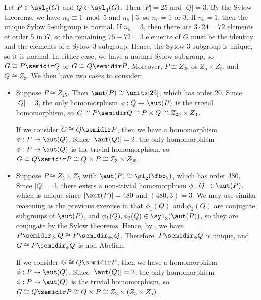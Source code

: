 \begin{sol}
    Let $P \in \syl_5(G)$ and $Q \in \syl_3(G)$.
	Then $|P| = 25$ and $|Q| = 3$.
	By the Sylow theorems, we have $n_5 \equiv 1 \bmod 5$ and $n_5 \mid 3$, so $n_5 = 1$ or 3.
	If $n_5 = 1$, then the unique Sylow 5-subgroup is normal.
	If $n_5 = 3$, then there are $3 \cdot 24 = 72$ elements of order 5 in $G$, so the remaining $75 - 72 = 3$ elements of $G$ must be the identity and the elements of a Sylow 3-subgroup.
	Hence, the Sylow 3-subgroup is unique, so it is normal.
	In either case, we have a normal Sylow subgroup, so $G \cong P \semidir Q$ or $G \cong Q \semidir P$.
	Moreover, $P \cong Z_{25}$ or $Z_5 \times Z_5$, and $Q \cong Z_3$.
	We then have two cases to consider:
    \begin{itemize}
        \item Suppose $P \cong Z_{25}$.
        Then $\aut(P) \cong \units[25]$, which has order 20.
        Since $|Q| = 3$, the only homomorphism $\phi : Q \to \aut(P)$ is the trivial homomorphism, so $G \cong P \semidir Q \cong P \times Q \cong Z_{25} \times Z_3$.
        
        If we consider $G \cong Q \semidir P$, then we have a homomorphism $\phi : P \to \aut(Q)$.
	    Since $|\aut(Q)| = 2$, the only homomorphism $\phi : P \to \aut(Q)$ is the trivial homomorphism, so $G \cong Q \semidir P \cong Q \times P \cong Z_3 \times Z_{25}$.
        \item Suppose $P \cong Z_5 \times Z_5$ with $\aut(P) \cong \gl_2(\fbb_5)$, which has order 480.
        Since $|Q| = 3$, there exists a non-trivial homomorphism $\phi : Q \to \aut(P)$, which is unique since $|\aut(P)| = 480$ and $(480, 3) = 3$.
        We may use similar reasoning as the previous exercise in that $\phi_1(Q)$ and $\phi_2(Q)$ are conjugate subgroups of $\aut(P)$, and $\phi_1(Q), \phi_2(Q) \in \syl_3(\aut(P))$, so they are conjugate by the Sylow theorems.
        Hence, by , we have $P \semidir_{\phi_1} Q \cong P \semidir_{\phi_2} Q$.
        Therefore, $P \semidir_\phi Q$ is unique, and $G \cong P \semidir_\phi Q$ is non-Abelian.
        
        If we consider $G \cong Q \semidir P$, then we have a homomorphism $\phi : P \to \aut(Q)$.
        Since $|\aut(Q)| = 2$, the only homomorphism $\phi : P \to \aut(Q)$ is the trivial homomorphism, so $G \cong Q \semidir P \cong Q \times P \cong Z_3 \times (Z_5 \times Z_5)$.
    \end{itemize}
\end{sol}

